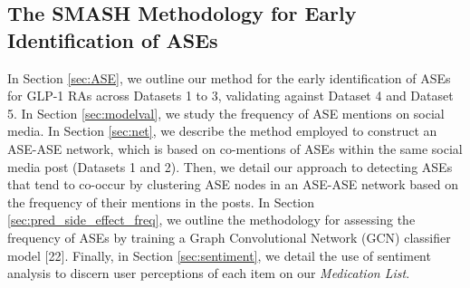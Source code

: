 \documentclass[referee,bst/sn-basic]{sn-jnl}%
\begin{document}
\begin{comment}
    
\begin{table}[h]
\caption{Last update dates and side effect URLs for GLP-1 RAs}
\label{tbl:manu}
\centering
\begin{tabular}{|l|l|l|p{6cm}|}
\hline
\textbf{Drug Name} & \textbf{Brand Name} & \textbf{Last Update} & \textbf{Side Effects URL} \\
\hline
Exenatide & Byetta & 2009 & \url{https://www.accessdata.fda.gov/drugsatfda_docs/label/2009/021773s9s11s18s22s25lbl.pdf} \\
Lixisenatide & Adlyxin & 2016 & \url{https://www.accessdata.fda.gov/drugsatfda_docs/label/2016/208471orig1s000lbl.pdf} \\
Dulaglutide & Trulicity & 2017 & \url{https://www.accessdata.fda.gov/drugsatfda_docs/label/2017/125469s007s008lbl.pdf} \\
Exenatide & Bydureon & 2017 & \url{https://www.accessdata.fda.gov/drugsatfda_docs/label/2017/209210s000lbl.pdf} \\
Semaglutide & Ozempic & 2017 & \url{https://www.accessdata.fda.gov/drugsatfda_docs/label/2017/209637lbl.pdf} \\
Liraglutide & Victoza & 2019 & \url{https://www.accessdata.fda.gov/drugsatfda_docs/label/2019/022341s031lbl.pdf} \\
Semaglutide & Rybelsus & 2019 & \url{https://www.accessdata.fda.gov/drugsatfda_docs/label/2019/213051s000lbl.pdf} \\
\hline
\end{tabular}
\end{table}

\end{comment}




\subsection{The SMASH Methodology for Early Identification of ASEs}
\label{sect:methods}
In Section \ref{sec:ASE}, we outline our method for the early identification of ASEs for GLP-1 RAs across Datasets 1 to 3, validating against Dataset 4 and Dataset 5.
In Section \ref{sec:modelval}, we study the frequency of ASE mentions on social media.
In Section \ref{sec:net}, we describe the method employed to construct an ASE-ASE network, which is based on co-mentions of ASEs within the same social media post (Datasets 1 and 2). 
Then, we detail our approach to detecting ASEs that tend to co-occur by clustering ASE nodes in an ASE-ASE network based on the frequency of their mentions in the posts.
In Section \ref{sec:pred_side_effect_freq}, we outline the methodology for assessing the frequency of ASEs by training a Graph Convolutional Network (GCN) classifier model [22].
Finally, in Section \ref{sec:sentiment}, we detail the use of sentiment analysis to discern user perceptions of each item on our \textit{Medication List}.
\end{document}

